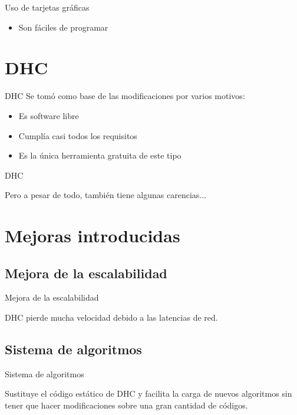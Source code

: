 \documentclass[12pt]{beamer}
\begin{document}
\begin{frame}{Uso de tarjetas gráficas}
\begin{itemize}
		\item Son fáciles de programar
			\only<4>{
				\testcode
			}
	\end{itemize}
\end{frame}

\section{DHC}
\begin{frame}{DHC}
	Se tomó como base de las modificaciones por varios motivos:
	\pause
	\begin{itemize}
		\item Es software libre
		\item Cumplía casi todos los requisitos
		\item Es la única herramienta gratuita de este tipo
	\end{itemize}
\end{frame}

\begin{frame}{DHC}
	\begin{center}
		Pero a pesar de todo, también tiene algunas carencias...		
	\end{center}
\end{frame}


\section{Mejoras introducidas}

\subsection{Mejora de la escalabilidad}
\begin{frame}{Mejora de la escalabilidad}
	\begin{center}
		DHC pierde mucha velocidad debido a las latencias de red.
	\end{center}
\end{frame}


\subsection{Sistema de algoritmos}
\begin{frame}{Sistema de algoritmos}
	\begin{center}
		Sustituye el código estático de DHC y facilita la carga de nuevos algoritmos sin tener que hacer modificaciones sobre una gran cantidad de códigos.
	\end{center}
\end{frame}
\end{document}
